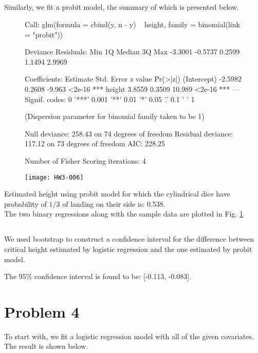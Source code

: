 \documentclass{article}
\begin{document}
\subsection{}
Similarly, we fit a probit model, the summary of which is presented below.\\
\begin{figure}[H]
\centering
\begin{Schunk}
\begin{Soutput}
Call:
glm(formula = cbind(y, n - y) ~ height, family = binomial(link = "probit"))

Deviance Residuals: 
    Min       1Q   Median       3Q      Max  
-3.3001  -0.5737   0.2599   1.1494   2.9969  

Coefficients:
            Estimate Std. Error z value Pr(>|z|)    
(Intercept)  -2.5982     0.2608  -9.963   <2e-16 ***
height        3.8559     0.3509  10.989   <2e-16 ***
---
Signif. codes:  0 '***' 0.001 '**' 0.01 '*' 0.05 '.' 0.1 ' ' 1

(Dispersion parameter for binomial family taken to be 1)

    Null deviance: 258.43  on 74  degrees of freedom
Residual deviance: 117.12  on 73  degrees of freedom
AIC: 228.25

Number of Fisher Scoring iterations: 4
\end{Soutput}
\end{Schunk}
\texttt{[image: HW3-006]}
\caption{}
\label{Fig2}
\end{figure}
Estimated height using probit model for which the cylindrical dice have probability of $1/3$ of landing on their side is: 0.538.\\
The two binary regressions along with the sample data are plotted in Fig. \ref{Fig2}

\subsection{}

We used bootstrap to construct a confidence interval for the difference between critical height estimated by logistic regression and the one estimated by probit model.
  
The 95\% confidence interval is found to be: [-0.113, -0.083].



\section{Problem 4}
To start with, we fit a logistic regression model with all of the given covariates. The result is shown below.\\
\end{document}
